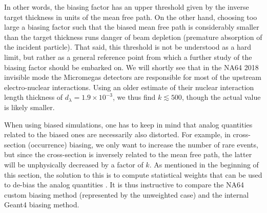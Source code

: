 %
In other words, the biasing factor has an upper threshold given by the inverse target thickness in units of the mean free path. On the other hand, choosing too large a biasing factor such that the biased mean free path is considerably smaller than the target thickness runs danger of beam depletion (premature absorption of the incident particle). That said, this threshold is not be understood as a hard limit, but rather as a general reference point from which a further study of the biasing factor should be embarked on. We will shortly see that in the NA64 2018 invisible mode the Micromegas detectors are responsible for most of the upstream electro-nuclear interactions. Using an older estimate of their nuclear interaction length thickness of $d_{\lambda} = 1.9 \times 10^{-3}$, we thus find $k \lesssim 500$, though the actual value is likely smaller.

When using biased simulations, one has to keep in mind that analog quantities related to the biased ones are necessarily also distorted. For example, in cross-section (occurrence) biasing, we only want to increase the number of rare events, but since the cross-section is inversely related to the mean free path, the latter will be unphysically decreased by a factor of $k$. As mentioned in the beginning of this section, the solution to this is to compute statistical weights that can be used to de-bias the analog quantities \cite{G4bias,Mendenhall_2012}. It is thus instructive to compare the NA64 custom biasing method (represented by the unweighted case) and the internal Geant4 biasing method.

